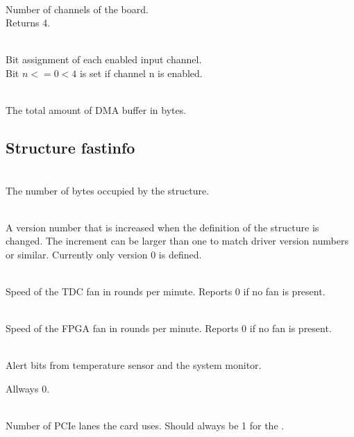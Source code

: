			\\
			Number of channels of the board.\\
			Returns 4.\par

			\\
			Bit assignment of each enabled input channel.\\
			Bit $n <= 0 < 4$ is set if channel n is enabled. \par

			\\
			The total amount of DMA buffer in bytes.

		\subsection{Structure \prefix fast\tu info}

			\\
			The number of bytes occupied by the structure. \par

			\\
			A version number that is increased when the definition of the structure is changed. The increment can be larger than one to match driver version numbers or similar. Currently only version 0 is defined.\par


			\\
			Speed of the TDC fan in rounds per minute. Reports 0 if no fan is present.\par

			\\
			Speed of the FPGA fan in rounds per minute. Reports 0 if no fan is present.\par

			\\
			Alert bits from temperature sensor and the system monitor.
			\par

			Allways 0. \par

			\\
			Number of PCIe lanes the card uses. Should always be 1 for the \deviceName. \par


